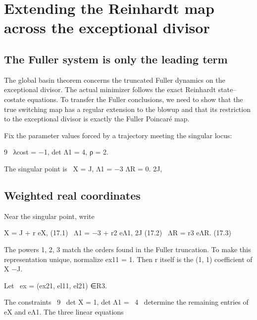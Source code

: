 \chapter{Extending the Reinhardt map across the exceptional divisor}
\section{The Fuller system is only the leading term}

The global basin theorem concerns the truncated Fuller dynamics on the exceptional divisor. The actual minimizer follows the exact Reinhardt state–costate equations. To transfer the Fuller conclusions, we need to show that the true switching map has a regular extension to the blowup and that its restriction to the exceptional divisor is exactly the Fuller Poincaré map.


Fix the parameter values forced by a trajectory meeting the singular locus:


\begin{displaytext}
9 \
λcost = −1, det Λ1 = 4, ρ = 2.
\end{displaytext}

\begin{displaytext}
The singular point is \
X = J, Λ1 = −3 ΛR = 0. 2J,
\end{displaytext}

\section{Weighted real coordinates}

Near the singular point, write


\begin{displaytext}
X = J + r eX, (17.1) \
Λ1 = −3 + r2 eΛ1, 2J (17.2) \
ΛR = r3 eΛR. (17.3)
\end{displaytext}

The powers 1, 2, 3 match the orders found in the Fuller truncation. To make this representation unique, normalize ex11 = 1. Then r itself is the (1, 1) coefficient of X −J.


\begin{displaytext}
Let \
ex = (ex21, el11, el21) ∈R3.
\end{displaytext}

\begin{displaytext}
The constraints \
9 \
det X = 1, det Λ1 = \
4 \
determine the remaining entries of eX and eΛ1. The three linear equations
\end{displaytext}

